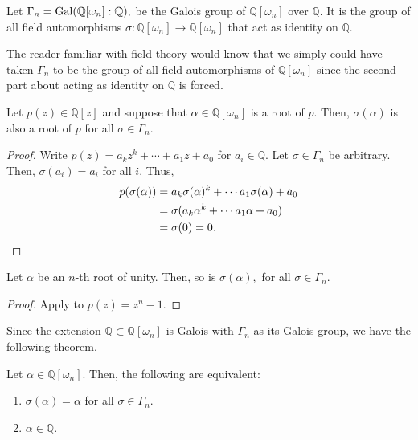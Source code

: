 \begin{defn}%
	Let $\Gamma_n = \operatorname{Gal}(\mathbb{Q}[\omega_n] : \mathbb{Q}),$ be the Galois group of $\mathbb{Q}[\omega_n]$ over $\mathbb{Q}.$ It is the group of all field automorphisms $\sigma : \mathbb{Q}[\omega_n] \to \mathbb{Q}[\omega_n]$ that act as identity on $\mathbb{Q}.$
\end{defn}

\begin{rem}
	The reader familiar with field theory would know that we simply could have taken $\Gamma_n$ to be the group of all field automorphisms of $\mathbb{Q}[\omega_n]$ since the second part about acting as identity on $\mathbb{Q}$ is forced.
\end{rem}

\begin{lem} \label{lem:ratpolyrootpermut}
	Let $p(z) \in \mathbb{Q}[z]$ and suppose that $\alpha \in \mathbb{Q}[\omega_n]$ is a root of $p.$ Then, $\sigma(\alpha)$ is also a root of $p$ for all $\sigma \in \Gamma_n.$
\end{lem}
\begin{proof} 
	Write $p(z) = a_kz^k + \cdots + a_1z + a_0$ for $a_i \in \mathbb{Q}.$ Let $\sigma \in \Gamma_n$ be arbitrary. Then, $\sigma(a_i) = a_i$ for all $i.$ Thus,
	\begin{align*} 
		p(\sigma(\alpha)) &= a_k \sigma(\alpha)^k + \cdots a_1 \sigma(\alpha) + a_0\\
		&= \sigma(a_k \alpha^k + \cdots a_1 \alpha + a_0)\\
		&= \sigma(0) = 0. \qedhere
	\end{align*}
\end{proof}

\begin{cor} \label{cor:ratpolyunityrootpermut}
	Let $\alpha$ be an $n$-th root of unity. Then, so is $\sigma(\alpha),$ for all $\sigma \in \Gamma_n.$
\end{cor}
\begin{proof} 
	Apply  to $p(z) = z^n - 1.$
\end{proof}

Since the extension $\mathbb{Q} \subset \mathbb{Q}[\omega_n]$ is Galois with $\Gamma_n$ as its Galois group, we have the following theorem.

\begin{thm} \label{thm:fixedfieldisQ}
	Let $\alpha \in \mathbb{Q}[\omega_n].$ Then, the following are equivalent:
	\begin{enumerate}
	 	\item $\sigma(\alpha) = \alpha$ for all $\sigma \in \Gamma_n.$
	 	\item $\alpha \in \mathbb{Q}.$
	 \end{enumerate} 
\end{thm}

